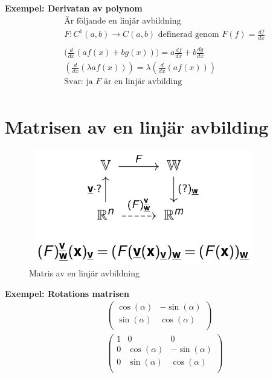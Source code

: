 \textbf{Exempel: Derivatan av polynom}
\begin{align*}
  &\quad  \text{Är följande en linjär avbildning } \\
  &\quad  F:C^1(a,b)\to{C}(a,b) \text{ definerad genom } F(f)=\frac{df}{dx}  \\
  &\quad  \\
  &\quad  \big( \frac{d}{dx}(af(x) + bg(x)) \big) = a\frac{df}{dx} + b\frac{dg}{dx} \\
  &\quad  ( \frac{d}{dx}(\lambda af(x)) ) = \lambda  ( \frac{d}{dx}(af(x)) ) \\
  &\quad  \text{Svar: ja $F$ är en linjär avbilding} \\
\end{align*}


\newpage

\section{Matrisen av en linjär avbilding}
\begin{figure}[h]
    \vspace{10mm}
    \centering
    \includegraphics[width=10cm, height=5cm]{image/matris_lin_avb.png} 
    \caption{Matris av en linjär avbildning}
\end{figure}

\textbf{Exempel: Rotations matrisen}
\begin{align*}
  &\quad
  \left(\begin{array}{cc}
    \cos(\alpha) & -\sin(\alpha)   \\
    \sin(\alpha) &  \cos(\alpha)   \\
  \end{array}\right)  \\
  &\quad
  \left(\begin{array}{ccc}
    1 & 0            & 0               \\
    0 & \cos(\alpha) & -\sin(\alpha)   \\
    0 & \sin(\alpha) &  \cos(\alpha)   \\
  \end{array}\right)  \\
\end{align*}


